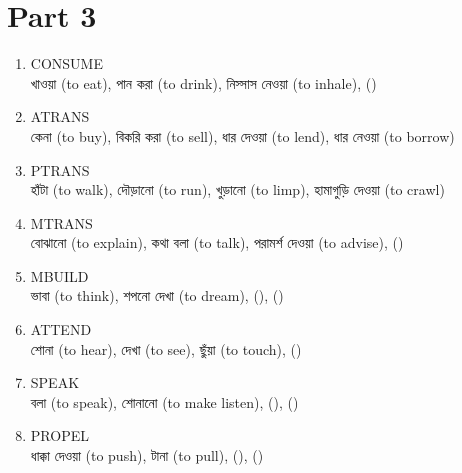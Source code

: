 \documentclass[11pt,a4paper,twocolumn]{article}
\begin{document}
	\section{Part 3}
	{\bg
	\begin{enumerate}
	
		\item CONSUME\\
		\textcolor{hlit}{খাওয়া} (to eat), \textcolor{hlit}{পান করা} (to drink), 
		\textcolor{hlit}{নিস্সাস নেওয়া} (to inhale), ()\\
		
		\item ATRANS\\
		\textcolor{hlit}{কেনা} (to buy), \textcolor{hlit}{বিকরি করা} (to sell), 
		\textcolor{hlit}{ধার দেওয়া} (to lend), \textcolor{hlit}{ধার নেওয়া} (to borrow)\\
		
		\item PTRANS\\
		\textcolor{hlit}{হাঁটা} (to walk), \textcolor{hlit}{দৌড়ানো} (to run), 
		\textcolor{hlit}{খুড়ানো} (to limp), \textcolor{hlit}{হামাগুড়ি দেওয়া} (to crawl)\\
		
		\item MTRANS\\
		\textcolor{hlit}{বোঝানো} (to explain), \textcolor{hlit}{কথা বলা} (to talk), 
		\textcolor{hlit}{পরামর্শ দেওয়া} (to advise), ()\\
		
		\item MBUILD\\
		\textcolor{hlit}{ভাবা} (to think), \textcolor{hlit}{শপনো দেখা} (to dream), 
		(), ()\\
		
		\item ATTEND\\
		\textcolor{hlit}{শোনা} (to hear), \textcolor{hlit}{দেখা} (to see), 
		\textcolor{hlit}{ছুঁয়া} (to touch), ()\\
		
		\item SPEAK\\
		\textcolor{hlit}{বলা} (to speak), \textcolor{hlit}{শোনানো} (to make listen), 
		(), ()\\
		
		\item PROPEL\\
		\textcolor{hlit}{ধাক্কা দেওয়া} (to push), \textcolor{hlit}{টানা} (to pull), 
		(), ()\\
		

\end{enumerate}}
\end{document}
